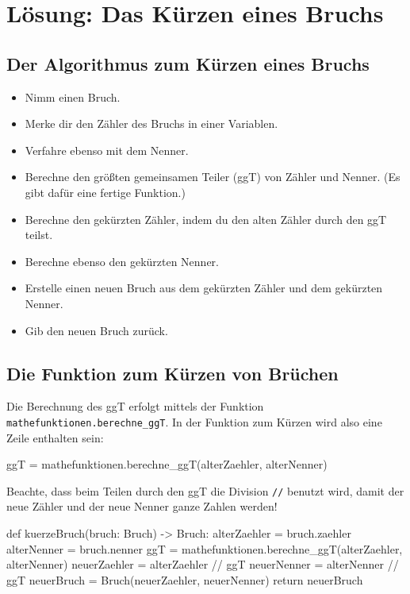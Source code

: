 \section{Lösung: Das Kürzen eines Bruchs}

\subsection*{Der Algorithmus zum Kürzen eines Bruchs}

\begin{itemize}
	\item Nimm einen Bruch.
	\item Merke dir den Zähler des Bruchs in einer Variablen.
	\item Verfahre ebenso mit dem Nenner.
	\item Berechne den größten gemeinsamen Teiler (ggT) von Zähler und Nenner. (Es gibt dafür eine fertige Funktion.)
	\item Berechne den gekürzten Zähler, indem du den alten Zähler durch den ggT teilst. 
	\item Berechne ebenso den gekürzten Nenner.
	\item Erstelle einen neuen Bruch aus dem gekürzten Zähler und dem gekürzten Nenner.
	\item Gib den neuen Bruch zurück.
\end{itemize}

\subsection*{Die Funktion zum Kürzen von Brüchen}

Die Berechnung des ggT erfolgt mittels der Funktion \texttt{mathefunktionen.berechne\_ggT}. In der Funktion zum Kürzen wird also eine Zeile enthalten sein:

\begin{codePython}
ggT = mathefunktionen.berechne_ggT(alterZaehler, alterNenner)
\end{codePython}

Beachte, dass beim Teilen durch den ggT die Division \texttt{//} benutzt wird, damit der neue Zähler und der neue Nenner ganze Zahlen werden!

\begin{codePython}
def kuerzeBruch(bruch: Bruch) -> Bruch:
	alterZaehler = bruch.zaehler
	alterNenner = bruch.nenner
	ggT = mathefunktionen.berechne_ggT(alterZaehler, alterNenner)
	neuerZaehler = alterZaehler // ggT
	neuerNenner = alterNenner // ggT
	neuerBruch = Bruch(neuerZaehler, neuerNenner)
	return neuerBruch
\end{codePython}

